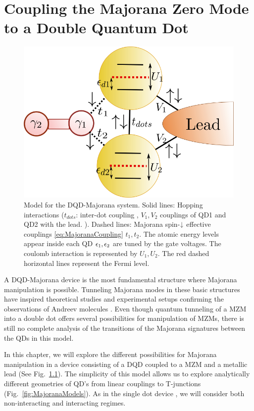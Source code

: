 \chapter{Coupling the Majorana Zero Mode to a Double Quantum Dot \label{chap:Results} }
\begin{figure}[hbt]
    \centering
    \includegraphics[scale=0.4]{IMAGES/GenModel.png}
    \caption{\label{fig:GenModel} Model for the DQD-Majorana system. Solid lines: Hopping interactions ($t_{dots}$: inter-dot coupling , $V_1,V_2$ couplings of QD1 and QD2 with the lead. ). Dashed lines: Majorana spin-$\downarrow$ effective couplings \eqref{eq:MajoranaCoupling} $t_1,t_2$. The atomic energy levels appear inside each QD $\epsilon_1, \epsilon_2$ are tuned by the gate voltages. The coulomb interaction is represented by $U_1,U_2$.  The red dashed horizontal lines represent the Fermi level. \protect {} } 
\end{figure}

\noindent A DQD-Majorana device is the most fundamental structure where Majorana manipulation is possible. Tunneling Majorana modes in these basic structures have inspired theoretical studies \cite{silva_andreev_2016,ivanov_coherent_2017} and experimental setups confirming the observations of Andreev molecules \cite{su_andreev_2017}. Even though quantum tunneling of a MZM into a double dot offers several possibilities for manipulation of MZMs,  there is still no complete analysis of the transitions of the Majorana signatures between the QDs in this model. 

 In this chapter, we will explore the different possibilities for Majorana manipulation in a device consisting of a DQD coupled to a MZM and a metallic lead (See Fig.\ \ref{fig:GenModel}). The simplicity of this model allows us to explore analytically different geometries of QD's from linear couplings to T-junctions (Fig.\ \ref{fig:MajoranaModels}). As in the single dot device , we will consider both non-interacting and interacting regimes. 


